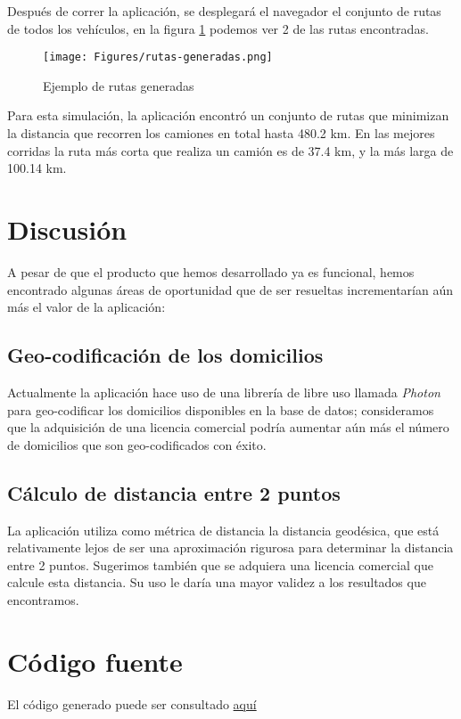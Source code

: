 \documentclass[journal]{IEEEtran}                                                          %
\begin{document}
        Después de correr la aplicación, se desplegará el navegador el conjunto de rutas de todos los vehículos, en la figura \ref{generated-routes} podemos ver 2 de las rutas encontradas.
    
        \begin{figure}[!ht]
            \centering
            \texttt{[image: Figures/rutas-generadas.png]}
            \caption{Ejemplo de rutas generadas} 
            \label{generated-routes}
        \end{figure}
        
        Para esta simulación, la aplicación encontró un conjunto de rutas que minimizan la distancia que recorren los camiones en total hasta 480.2 km. En las mejores corridas la ruta más corta que realiza un camión es de 37.4 km, y la más larga de 100.14 km.
        
    \section{Discusión} \label{discusion}
        
        A pesar de que el producto que hemos desarrollado ya es funcional, hemos encontrado algunas áreas de oportunidad que de ser resueltas incrementarían aún más el valor de la aplicación:
        
        \subsection{Geo-codificación de los domicilios}
            
            Actualmente la aplicación hace uso de una librería de libre uso llamada \emph{Photon} para geo-codificar los domicilios disponibles en la base de datos; consideramos que la adquisición de una licencia comercial podría aumentar aún más el número de domicilios que son geo-codificados con éxito.
            
        \subsection{Cálculo de distancia entre 2 puntos}
            
            La aplicación utiliza como métrica de distancia la distancia geodésica, que está relativamente lejos de ser una aproximación rigurosa para determinar la distancia entre 2 puntos. Sugerimos también que se adquiera una licencia comercial que calcule esta distancia. Su uso le daría una mayor validez a los resultados que encontramos.
            
    \appendices
    
    \section{Código fuente}\label{code}
    
        El código generado puede ser consultado \href{https://github.com/JuanEcheagaray75/Coppel-vrp-tsp}{aquí}
    
    
    
\end{document}
